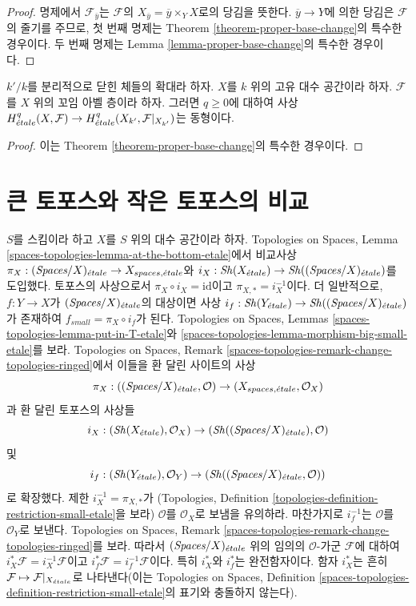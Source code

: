 \begin{proof}
명제에서 $\mathcal{F}_{\overline{y}}$는 $\mathcal{F}$의
$X_{\overline{y}} = \overline{y} \times_Y X$로의 당김을 뜻한다.
$\overline{y} \to Y$에 의한 당김은 $\mathcal{F}$의 줄기를
주므로, 첫 번째 명제는 Theorem
\ref{theorem-proper-base-change}의 특수한 경우이다.
두 번째 명제는 Lemma \ref{lemma-proper-base-change}의
특수한 경우이다.
\end{proof}

\begin{lemma}
\label{lemma-base-change-separably-closed}
$k'/k$를 분리적으로 닫힌 체들의 확대라 하자.
$X$를 $k$ 위의 고유 대수 공간이라 하자.
$\mathcal{F}$를 $X$ 위의 꼬임 아벨 층이라 하자.
그러면 $q \geq 0$에 대하여 사상
$H^q_{\acute{e}tale}(X, \mathcal{F}) \to
H^q_{\acute{e}tale}(X_{k'}, \mathcal{F}|_{X_{k'}})$는 동형이다.
\end{lemma}

\begin{proof}
이는 Theorem \ref{theorem-proper-base-change}의 특수한 경우이다.
\end{proof}


\section{큰 토포스와 작은 토포스의 비교}
\label{section-compare}

\noindent
$S$를 스킴이라 하고 $X$를 $S$ 위의 대수 공간이라 하자.
Topologies on Spaces, Lemma
\ref{spaces-topologies-lemma-at-the-bottom-etale}에서 비교사상
$\pi_X : (\textit{Spaces}/X)_{\acute{e}tale} \to X_{spaces, {\acute{e}tale}}$와
$i_X : \mathop{\mathit{Sh}}\nolimits(X_{\acute{e}tale}) \to \mathop{\mathit{Sh}}\nolimits((\textit{Spaces}/X)_{\acute{e}tale})$를 도입했다.
토포스의 사상으로서 $\pi_X \circ i_X = \text{id}$이고
$\pi_{X, *} = i_X^{-1}$이다.
더 일반적으로, $f : Y \to X$가 $(\textit{Spaces}/X)_{\acute{e}tale}$의 대상이면
사상
$i_f : \mathop{\mathit{Sh}}\nolimits(Y_{\acute{e}tale}) \to \mathop{\mathit{Sh}}\nolimits((\textit{Spaces}/X)_{\acute{e}tale})$가 존재하여
$f_{small} = \pi_X \circ i_f$가 된다. Topologies on Spaces, Lemmas
\ref{spaces-topologies-lemma-put-in-T-etale}와
\ref{spaces-topologies-lemma-morphism-big-small-etale}를 보라.
Topologies on Spaces, Remark
\ref{spaces-topologies-remark-change-topologies-ringed}에서 이들을 환 달린
사이트의 사상
$$
\pi_X :
((\textit{Spaces}/X)_{\acute{e}tale}, \mathcal{O})
\to
(X_{spaces, {\acute{e}tale}}, \mathcal{O}_X)
$$
과 환 달린 토포스의 사상들
$$
i_X :
(\mathop{\mathit{Sh}}\nolimits(X_{\acute{e}tale}), \mathcal{O}_X)
\to
(\mathop{\mathit{Sh}}\nolimits((\textit{Spaces}/X)_{\acute{e}tale}), \mathcal{O})
$$
및
$$
i_f :
(\mathop{\mathit{Sh}}\nolimits(Y_{\acute{e}tale}), \mathcal{O}_Y)
\to
(\mathop{\mathit{Sh}}\nolimits((\textit{Spaces}/X)_{\acute{e}tale}, \mathcal{O}))
$$
로 확장했다. 제한 $i_X^{-1} = \pi_{X, *}$가
(Topologies, Definition
\ref{topologies-definition-restriction-small-etale}을 보라)
$\mathcal{O}$를 $\mathcal{O}_X$로 보냄을 유의하라.
마찬가지로 $i_f^{-1}$는 $\mathcal{O}$를 $\mathcal{O}_Y$로 보낸다.
Topologies on Spaces, Remark
\ref{spaces-topologies-remark-change-topologies-ringed}를 보라.
따라서 $(\textit{Spaces}/X)_{\acute{e}tale}$ 위의 임의의 $\mathcal{O}$-가군
$\mathcal{F}$에 대하여 $i_X^*\mathcal{F} = i_X^{-1}\mathcal{F}$이고
$i_f^*\mathcal{F} = i_f^{-1}\mathcal{F}$이다. 특히 $i_X^*$와 $i_f^*$는
완전함자이다. 함자 $i_X^*$는 흔히
$\mathcal{F} \mapsto \mathcal{F}|_{X_{\acute{e}tale}}$로 나타낸다(이는
Topologies on Spaces, Definition
\ref{spaces-topologies-definition-restriction-small-etale}의 표기와
충돌하지 않는다).

